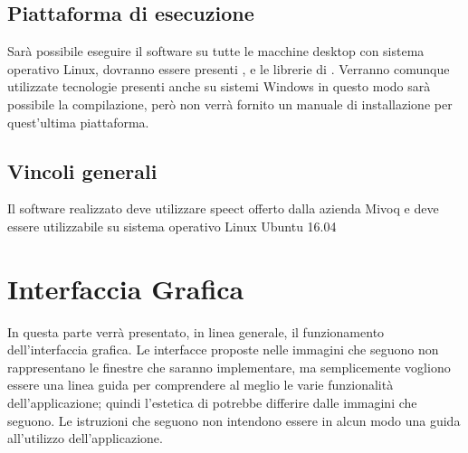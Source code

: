 \documentclass[../AnalisideiRequisiti.tex]{subfiles}
\begin{document}
\section{Piattaforma di esecuzione}
Sarà possibile eseguire il software su tutte le macchine desktop con sistema operativo Linux, dovranno essere presenti ,  e le librerie di . Verranno comunque utilizzate tecnologie presenti anche su sistemi Windows in questo modo sarà possibile la compilazione, però non verrà fornito un manuale di installazione per quest’ultima piattaforma.

\section{Vincoli generali}
Il software realizzato deve utilizzare speect offerto dalla azienda Mivoq e deve essere utilizzabile su sistema operativo Linux Ubuntu 16.04 
	

\chapter{Interfaccia Grafica}
In questa parte verrà presentato, in linea generale, il funzionamento dell'interfaccia grafica. Le interfacce proposte nelle immagini che seguono non rappresentano le finestre che saranno implementare, ma semplicemente vogliono essere una linea guida per comprendere al meglio le varie funzionalità dell'applicazione; quindi l'estetica di \textit{} potrebbe differire dalle immagini che seguono. Le istruzioni che seguono non intendono essere in alcun modo una guida all'utilizzo dell'applicazione.
\end{document}
